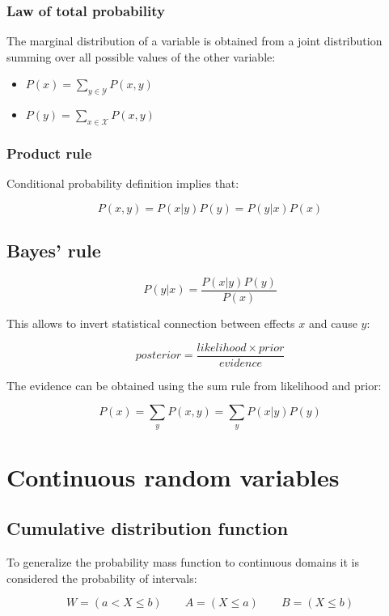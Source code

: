 		\subsubsection{Law of total probability}
		The marginal distribution of a variable is obtained from a joint distribution summing over all possible values of the other variable:

		\begin{multicols}{2}
			\begin{itemize}
				\item $P(x) = \sum\limits_{y\in\mathcal{Y}}P(x,y)$
				\item $P(y) = \sum\limits_{x\in\mathcal{X}}P(x,y)$
			\end{itemize}
		\end{multicols}

		\subsubsection{Product rule}
		Conditional probability definition implies that:

		$$P(x,y) = P(x|y)P(y) = P(y|x)P(x)$$

	\subsection{Bayes' rule}

	$$P(y|x) = \frac{P(x|y)P(y)}{P(x)}$$

	This allows to invert statistical connection between effects $x$ and cause $y$:

	$$posterior = \frac{likelihood\times prior}{evidence}$$

	The evidence can be obtained using the sum rule from likelihood and prior:

	$$P(x) = \sum\limits_yP(x,y) = \sum\limits_yP(x|y)P(y)$$

\section{Continuous random variables}

	\subsection{Cumulative distribution function}
	To generalize the probability mass function to continuous domains it is considered the probability of intervals:

	$$W = (a < X \le b) \qquad A = (X \le a)\qquad B = (X\le b)$$


